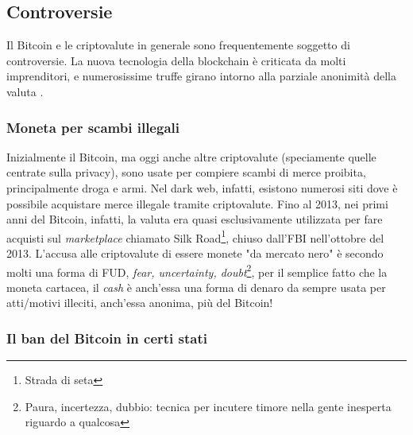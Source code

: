 \documentclass {article}
\begin{document}
%
%

\subsection {Controversie}


Il Bitcoin e le criptovalute in generale sono frequentemente soggetto di controversie. La nuova tecnologia della blockchain è criticata da molti imprenditori, e numerosissime truffe girano intorno alla parziale anonimità della valuta \cite{controversy}.

\subsubsection {Moneta per scambi illegali}

Inizialmente il Bitcoin, ma oggi anche altre criptovalute (speciamente quelle centrate sulla privacy), sono usate per compiere scambi di merce proibita, principalmente droga e armi.
Nel dark web, infatti, esistono numerosi siti dove è possibile acquistare merce illegale tramite criptovalute.
Fino al 2013, nei primi anni del Bitcoin, infatti, la valuta era quasi esclusivamente utilizzata per fare acquisti sul \textit{marketplace} chiamato Silk Road\footnote{Strada di seta}, chiuso dall'FBI nell'ottobre del 2013.
L'accusa alle criptovalute di essere monete "da mercato nero" è secondo molti una forma di FUD, \textit{fear, uncertainty, doubt}\footnote{Paura, incertezza, dubbio: tecnica per incutere timore nella gente inesperta riguardo a qualcosa}, per il semplice fatto che la moneta cartacea, il \textit{cash} è anch'essa una forma di denaro da sempre usata per atti/motivi illeciti, anch'essa anonima, più del Bitcoin! 

\subsubsection {Il ban del Bitcoin in certi stati}
\end{document}
